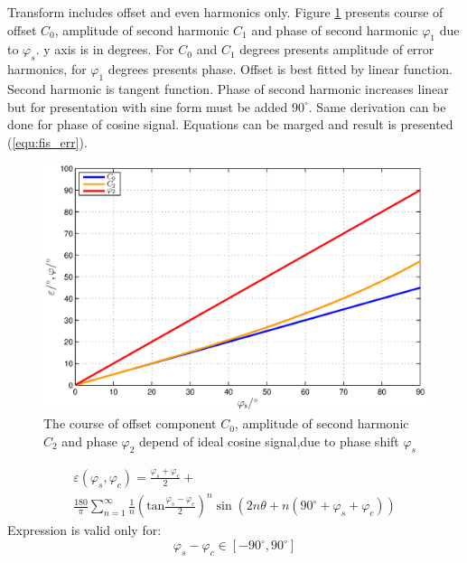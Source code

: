 \documentclass[a4paper]{article}
\begin{document}
Transform includes offset and even harmonics only. Figure  \ref{fig:fis} presents course of offset $C_0$, amplitude of second harmonic $C_1$ and phase    of second harmonic $\varphi_{1}$ due to $\varphi_s$. y axis is in degrees. For $C_0$ and $C_1$ degrees presents amplitude of error harmonics, for $\varphi_{1}$ degrees presents phase. Offset is best fitted by linear function. Second harmonic is tangent function. Phase of second harmonic increases linear but for presentation with sine form must be added $90^\circ$. Same derivation can be done for phase of cosine signal. Equations can be marged and result is presented (\ref{equ:fis_err}).
\begin{figure}[!htb]
	\begin{center}
		\includegraphics[width=\linewidth]{./Slike/fis.eps}
		\caption{The course of offset component $C_0$, amplitude of second harmonic  $C_2$ and phase $\varphi_2$ depend of ideal cosine signal,due to phase shift $\varphi_{s}$} \label{fig:fis}
	\end{center}
\end{figure}
\begin{multline}
\label{equ:fis_err}
\varepsilon(\varphi_{s},\varphi_{c}) = \frac{\varphi_{s}+\varphi_{c}}{2}+\\ \frac{180}{\pi}\sum_{n=1}^{\infty}\frac{1}{n} (\mathrm{tan}\frac{\varphi_{s}-\varphi_{c}}{2})^n \sin (2n \theta+n(90^\circ +\varphi_{s}+\varphi_{c}))
\end{multline}
Expression is valid only for:
$$ \varphi_{s}-\varphi_{c} \in [ -90^\circ , 90^\circ ] $$
\end{document}
